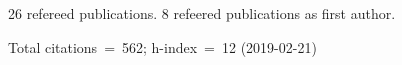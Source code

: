26 refereed publications. 8 refeered publications as first author.

Total citations~=~562; h-index~=~12 (2019-02-21)